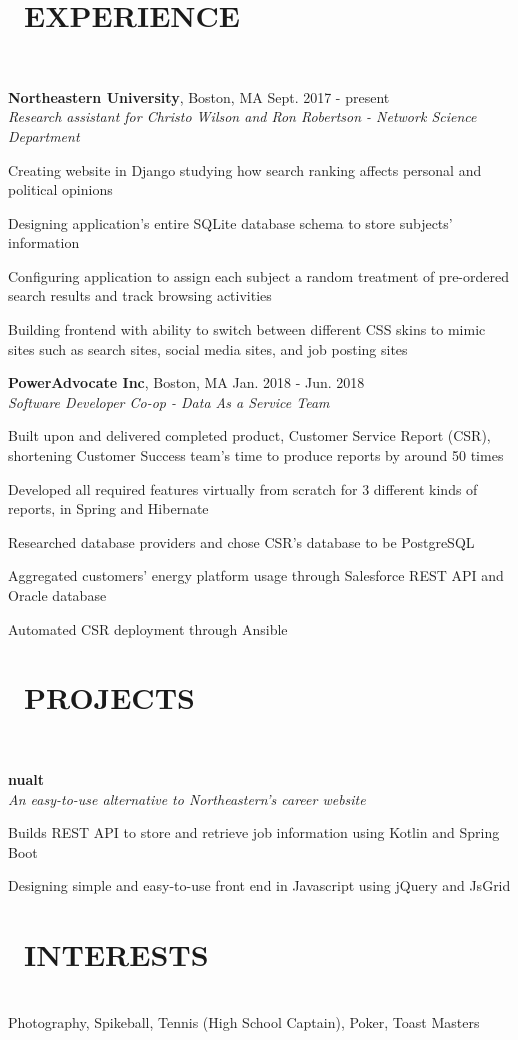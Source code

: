 \documentclass[11pt]{res}
\newcommand{\sectionunderline}{\vspace{-3mm}\hrulefill\\}
\newcommand{\newsect}[1]{\section{\Large \bf #1}}
\begin{document}
\begin{resume}
  \newsect{\faUsers\ EXPERIENCE}{
    \sectionunderline{
      {\bf Northeastern University}, Boston, MA \hfill Sept. 2017 - present\\
      {\it Research assistant for Christo Wilson and Ron Robertson - Network Science Department}
      \begin{itemize}
        {\item Creating website in Django studying how search ranking affects personal and political opinions}
        {\item Designing application's entire SQLite database schema to store subjects' information}
        {\item Configuring application to assign each subject a random treatment of pre-ordered search results and track browsing activities}
        {\item Building frontend with ability to switch between different CSS skins to mimic sites such as search sites, social media sites, and job posting sites}
      \end{itemize}

      {\bf PowerAdvocate Inc}, Boston, MA \hfill Jan. 2018 - Jun. 2018\\
      {\it Software Developer Co-op - Data As a Service Team}
      \begin{itemize}
        {\item Built upon and delivered completed product, Customer Service Report (CSR), shortening Customer Success team's time to produce reports by around 50 times}
        {\item Developed all required features virtually from scratch for 3 different kinds of reports, in Spring and Hibernate}
        {\item Researched database providers and chose CSR's database to be PostgreSQL}
        {\item Aggregated customers' energy platform usage through Salesforce REST API and Oracle database}
        {\item Automated CSR deployment through Ansible}
      \end{itemize}
    }
  }

  \newsect{\faGithubAlt\ PROJECTS}{
    \sectionunderline{
      {\bf nualt}\\
      {\it An easy-to-use alternative to Northeastern's career website}
      \begin{itemize}
        {\item {}}
        {\item Builds REST API to store and retrieve job information using Kotlin and Spring Boot}
        {\item Designing simple and easy-to-use front end in Javascript using jQuery and JsGrid}
      \end{itemize}
    }
  }

  \newsect{\faCamera\ INTERESTS}{
    \sectionunderline{
      Photography, Spikeball, Tennis (High School Captain), Poker, Toast Masters
    }
  }
\end{resume}
\end{document}
